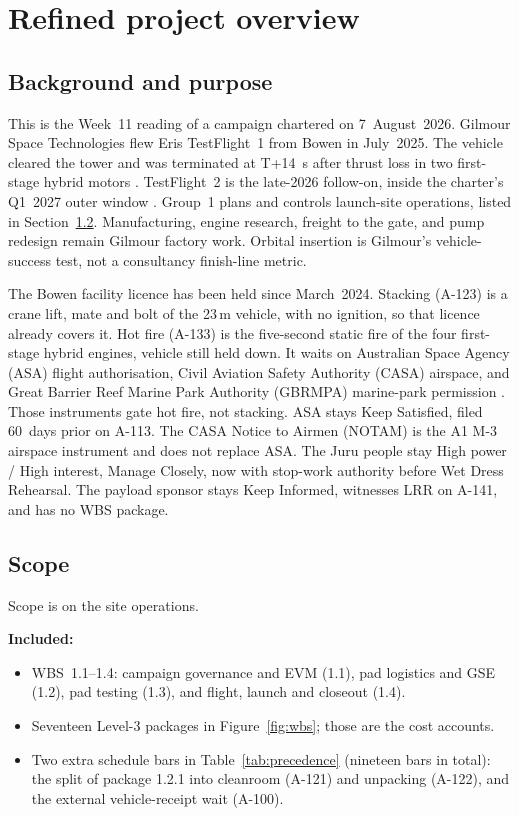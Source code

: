 \section{Refined project overview}
\label{sec:overview}

\subsection{Background and purpose}
\label{sec:overview-background}

This is the Week~11 reading of a campaign chartered on 7~August~2026. Gilmour Space Technologies flew Eris TestFlight~1 from Bowen in July~2025. The vehicle cleared the tower and was terminated at T+14~s after thrust loss in two first-stage hybrid motors \citep{smith2025,gilmour2025,asa2025}. TestFlight~2 is the late-2026 follow-on, inside the charter's Q1~2027 outer window \citep{dougherty2026}. Group~1 plans and controls launch-site operations, listed in Section~\ref{sec:overview-scope}. Manufacturing, engine research, freight to the gate, and pump redesign remain Gilmour factory work. Orbital insertion is Gilmour's vehicle-success test, not a consultancy finish-line metric.

The Bowen facility licence has been held since March~2024. Stacking (A-123) is a crane lift, mate and bolt of the 23\,m vehicle, with no ignition, so that licence already covers it. Hot fire (A-133) is the five-second static fire of the four first-stage hybrid engines, vehicle still held down. It waits on Australian Space Agency (ASA) flight authorisation, Civil Aviation Safety Authority (CASA) airspace, and Great Barrier Reef Marine Park Authority (GBRMPA) marine-park permission \citep{casa2024,gbrmpa2019,asa2025}. Those instruments gate hot fire, not stacking. ASA stays Keep Satisfied, filed 60~days prior on A-113. The CASA Notice to Airmen (NOTAM) is the A1 M-3 airspace instrument and does not replace ASA. The Juru people stay High power / High interest, Manage Closely, now with stop-work authority before Wet Dress Rehearsal. The payload sponsor stays Keep Informed, witnesses LRR on A-141, and has no WBS package.

\subsection{Scope}
\label{sec:overview-scope}

Scope is on the site operations.

\textbf{Included:}
\begin{itemize}[leftmargin=1.4em,itemsep=0.25em]
\item WBS~1.1--1.4: campaign governance and EVM (1.1), pad logistics and GSE (1.2), pad testing (1.3), and flight, launch and closeout (1.4).
\item Seventeen Level-3 packages in Figure~\ref{fig:wbs}; those are the cost accounts.
\item Two extra schedule bars in Table~\ref{tab:precedence} (nineteen bars in total): the split of package 1.2.1 into cleanroom (A-121) and unpacking (A-122), and the external vehicle-receipt wait (A-100).
\end{itemize}

